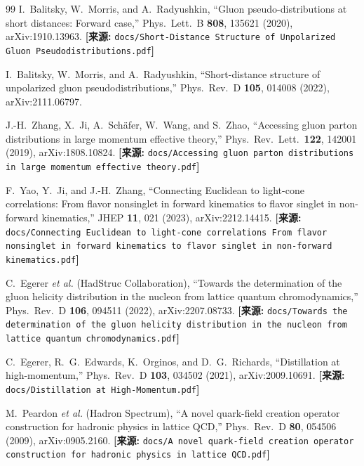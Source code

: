 \documentclass[12pt,a4paper]{ctexart}
\theoremstyle{definition}
\begin{document}
\begin{thebibliography}{99}
I.~Balitsky, W.~Morris, and A.~Radyushkin,
``Gluon pseudo-distributions at short distances: Forward case,''
Phys.\ Lett.\ B \textbf{808}, 135621 (2020), arXiv:1910.13963.
\quad\textbf{[来源:} \texttt{docs/Short-Distance Structure of Unpolarized Gluon Pseudodistributions.pdf}\textbf{]}

I.~Balitsky, W.~Morris, and A.~Radyushkin,
``Short-distance structure of unpolarized gluon pseudodistributions,''
Phys.\ Rev.\ D \textbf{105}, 014008 (2022), arXiv:2111.06797.

J.-H.~Zhang, X.~Ji, A.~Sch\"afer, W.~Wang, and S.~Zhao,
``Accessing gluon parton distributions in large momentum effective theory,''
Phys.\ Rev.\ Lett.\ \textbf{122}, 142001 (2019), arXiv:1808.10824.
\quad\textbf{[来源:} \texttt{docs/Accessing gluon parton distributions in large momentum effective theory.pdf}\textbf{]}


F.~Yao, Y.~Ji, and J.-H.~Zhang,
``Connecting Euclidean to light-cone correlations: From flavor nonsinglet in forward kinematics to flavor singlet in non-forward kinematics,''
JHEP \textbf{11}, 021 (2023), arXiv:2212.14415.
\quad\textbf{[来源:} \texttt{docs/Connecting Euclidean to light-cone correlations From flavor nonsinglet in forward kinematics to flavor singlet in non-forward kinematics.pdf}\textbf{]}


C.~Egerer \textit{et al.} (HadStruc Collaboration),
``Towards the determination of the gluon helicity distribution in the nucleon from lattice quantum chromodynamics,''
Phys.\ Rev.\ D \textbf{106}, 094511 (2022), arXiv:2207.08733.
\quad\textbf{[来源:} \texttt{docs/Towards the determination of the gluon helicity distribution in the nucleon from lattice quantum chromodynamics.pdf}\textbf{]}

C.~Egerer, R.~G.~Edwards, K.~Orginos, and D.~G.~Richards,
``Distillation at high-momentum,''
Phys.\ Rev.\ D \textbf{103}, 034502 (2021), arXiv:2009.10691.
\quad\textbf{[来源:} \texttt{docs/Distillation at High-Momentum.pdf}\textbf{]}

M.~Peardon \textit{et al.} (Hadron Spectrum),
``A novel quark-field creation operator construction for hadronic physics in lattice QCD,''
Phys.\ Rev.\ D \textbf{80}, 054506 (2009), arXiv:0905.2160.
\quad\textbf{[来源:} \texttt{docs/A novel quark-field creation operator construction for hadronic physics in lattice QCD.pdf}\textbf{]}


\end{thebibliography}
\end{document}
